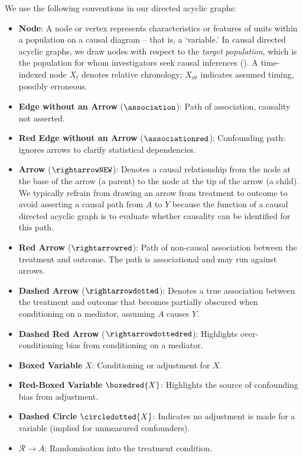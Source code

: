 \documentclass[
  single column]{article}
\begin{document}
We use the following conventions in our directed acyclic graphs:

\begin{itemize}
\item
  \textbf{Node}: A node or vertex represents characteristics or features
  of units within a population on a causal diagram -- that is, a
  `variable.' In causal directed acyclic graphs, we draw nodes with
  respect to the \emph{target population}, which is the population for
  whom investigators seek causal inferences
  (). A time-indexed
  node \(X_t\) denotes relative chronology; \(X_{\phi t}\) indicates
  assumed timing, possibly erroneous.
\item
  \textbf{Edge without an Arrow} (\(\association\)): Path of
  association, causality not asserted.
\item
  \textbf{Red Edge without an Arrow} (\(\associationred\)): Confounding
  path: ignores arrows to clarify statistical dependencies.
\item
  \textbf{Arrow} (\(\rightarrowNEW\)): Denotes a causal relationship
  from the node at the base of the arrow (a parent) to the node at the
  tip of the arrow (a child). We typically refrain from drawing an arrow
  from treatment to outcome to avoid asserting a causal path from \(A\)
  to \(Y\) because the function of a causal directed acyclic graph is to
  evaluate whether causality can be identified for this path.
\item
  \textbf{Red Arrow} (\(\rightarrowred\)): Path of non-causal
  association between the treatment and outcome. The path is
  associational and may run against arrows.
\item
  \textbf{Dashed Arrow} (\(\rightarrowdotted\)): Denotes a true
  association between the treatment and outcome that becomes partially
  obscured when conditioning on a mediator, assuming \(A\) causes \(Y\).
\item
  \textbf{Dashed Red Arrow} (\(\rightarrowdottedred\)): Highlights
  over-conditioning bias from conditioning on a mediator.
\item
  \textbf{Boxed Variable} \(\boxed{X}\): Conditioning or adjustment for
  \(X\).
\item
  \textbf{Red-Boxed Variable} \(\boxedred{X}\): Highlights the source of
  confounding bias from adjustment.
\item
  \textbf{Dashed Circle} \(\circledotted{X}\): Indicates no adjustment
  is made for a variable (implied for unmeasured confounders).
\item
  \textbf{\(\mathcal{R} \rightarrow A\)}: Randomisation into the
  treatment condition.
\end{itemize}
\end{document}
